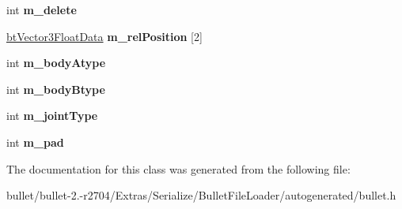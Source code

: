 \begin{DoxyCompactItemize}
\item 
\hypertarget{class_bullet_1_1bt_soft_body_joint_data_ab4dbc59646bbf784d1246072db034848}{int {\bfseries m\+\_\+delete}}\label{class_bullet_1_1bt_soft_body_joint_data_ab4dbc59646bbf784d1246072db034848}

\item 
\hypertarget{class_bullet_1_1bt_soft_body_joint_data_ac14a72babe5cb540aef223e19fd20f1c}{\hyperlink{class_bullet_1_1bt_vector3_float_data}{bt\+Vector3\+Float\+Data} {\bfseries m\+\_\+rel\+Position} \mbox{[}2\mbox{]}}\label{class_bullet_1_1bt_soft_body_joint_data_ac14a72babe5cb540aef223e19fd20f1c}

\item 
\hypertarget{class_bullet_1_1bt_soft_body_joint_data_a3c86c6b3664d307784c975926580a1fc}{int {\bfseries m\+\_\+body\+Atype}}\label{class_bullet_1_1bt_soft_body_joint_data_a3c86c6b3664d307784c975926580a1fc}

\item 
\hypertarget{class_bullet_1_1bt_soft_body_joint_data_aaefa0a7ef5de2a30e072c111b87e0e70}{int {\bfseries m\+\_\+body\+Btype}}\label{class_bullet_1_1bt_soft_body_joint_data_aaefa0a7ef5de2a30e072c111b87e0e70}

\item 
\hypertarget{class_bullet_1_1bt_soft_body_joint_data_a6530a9cfbad0c1ca9dbfa95a1b2eeab0}{int {\bfseries m\+\_\+joint\+Type}}\label{class_bullet_1_1bt_soft_body_joint_data_a6530a9cfbad0c1ca9dbfa95a1b2eeab0}

\item 
\hypertarget{class_bullet_1_1bt_soft_body_joint_data_aa8607ab1a73afdace4469c58f71c2efc}{int {\bfseries m\+\_\+pad}}\label{class_bullet_1_1bt_soft_body_joint_data_aa8607ab1a73afdace4469c58f71c2efc}

\end{DoxyCompactItemize}


The documentation for this class was generated from the following file\+:\begin{DoxyCompactItemize}
\item 
bullet/bullet-\/2.-\/r2704/\+Extras/\+Serialize/\+Bullet\+File\+Loader/autogenerated/bullet.\+h\end{DoxyCompactItemize}
